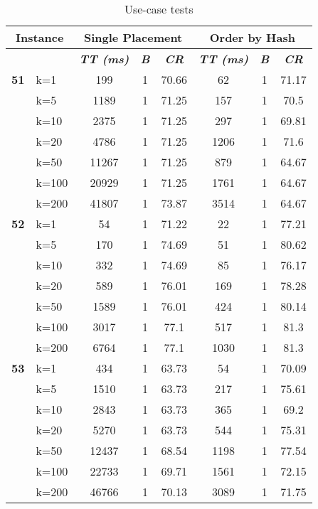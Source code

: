     \begin{table}[htbp]
    \caption{Use-case tests}
    \begin{tabular}{|l|l|c|c|c|c|c|c|}
    
    \multicolumn{ 2}{|c|}{\textbf{Instance}} & \multicolumn{ 3}{c|}{\textbf{Single Placement}} & \multicolumn{ 3}{c|}{\textbf{Order by Hash}} \\ \hline
    \multicolumn{ 2}{|l|}{} & \textbf{\textit{TT (ms)}} & \textbf{\textit{B}} & \textbf{\textit{CR}} & \textbf{\textit{TT (ms)}} & \textbf{\textit{B}} & \textbf{\textit{CR}} \\ \hline
    \multicolumn{1}{|r|}{\textbf{51}} & k=1 & 199 & 1 & 70.66 & 62 & 1 & 71.17 \\ 
     & k=5 & 1189 & 1 & 71.25 & 157 & 1 & 70.5 \\ 
     & k=10 & 2375 & 1 & 71.25 & 297 & 1 & 69.81 \\ 
     & k=20 & 4786 & 1 & 71.25 & 1206 & 1 & 71.6 \\ 
     & k=50 & 11267 & 1 & 71.25 & 879 & 1 & 64.67 \\ 
     & k=100 & 20929 & 1 & 71.25 & 1761 & 1 & 64.67 \\ 
     & k=200 & 41807 & 1 & 73.87 & 3514 & 1 & 64.67 \\ \hline
    \multicolumn{1}{|r|}{\textbf{52}} & k=1 & 54 & 1 & 71.22 & 22 & 1 & 77.21 \\ 
     & k=5 & 170 & 1 & 74.69 & 51 & 1 & 80.62 \\ 
     & k=10 & 332 & 1 & 74.69 & 85 & 1 & 76.17 \\ 
     & k=20 & 589 & 1 & 76.01 & 169 & 1 & 78.28 \\ 
     & k=50 & 1589 & 1 & 76.01 & 424 & 1 & 80.14 \\ 
     & k=100 & 3017 & 1 & 77.1 & 517 & 1 & 81.3 \\ 
     & k=200 & 6764 & 1 & 77.1 & 1030 & 1 & 81.3 \\ \hline
    \multicolumn{1}{|r|}{\textbf{53}} & k=1 & 434 & 1 & 63.73 & 54 & 1 & 70.09 \\ 
     & k=5 & 1510 & 1 & 63.73 & 217 & 1 & 75.61 \\ 
     & k=10 & 2843 & 1 & 63.73 & 365 & 1 & 69.2 \\ 
     & k=20 & 5270 & 1 & 63.73 & 544 & 1 & 75.31 \\ 
     & k=50 & 12437 & 1 & 68.54 & 1198 & 1 & 77.54 \\ 
     & k=100 & 22733 & 1 & 69.71 & 1561 & 1 & 72.15 \\ 
     & k=200 & 46766 & 1 & 70.13 & 3089 & 1 & 71.75 \\ \hline

\end{tabular}
\end{table}
